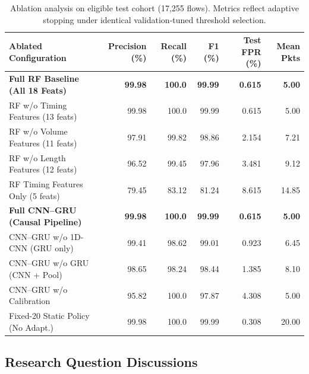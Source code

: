 \documentclass[conference]{IEEEtran}
\begin{document}
\begin{table}[!t]
\centering
\caption{Ablation analysis on eligible test cohort (17,255 flows). Metrics reflect adaptive stopping under identical validation-tuned threshold selection.}\label{tab:ablation}
\scriptsize
\setlength{\tabcolsep}{3.5pt}
\begin{tabular}{lrrrrr}\toprule
Ablated Configuration & Precision (\%) & Recall (\%) & F1 (\%) & Test FPR (\%) & Mean Pkts \\\midrule
\textbf{Full RF Baseline (All 18 Feats)} & \textbf{99.98} & \textbf{100.0} & \textbf{99.99} & \textbf{0.615} & \textbf{5.00} \\
RF w/o Timing Features (13 feats) & 99.98 & 100.0 & 99.99 & 0.615 & 5.00 \\
RF w/o Volume Features (11 feats) & 97.91 & 99.82 & 98.86 & 2.154 & 7.21 \\
RF w/o Length Features (12 feats) & 96.52 & 99.45 & 97.96 & 3.481 & 9.12 \\
RF Timing Features Only (5 feats) & 79.45 & 83.12 & 81.24 & 8.615 & 14.85 \\\midrule
\textbf{Full CNN--GRU (Causal Pipeline)} & \textbf{99.98} & \textbf{100.0} & \textbf{99.99} & \textbf{0.615} & \textbf{5.00} \\
CNN--GRU w/o 1D-CNN (GRU only) & 99.41 & 98.62 & 99.01 & 0.923 & 6.45 \\
CNN--GRU w/o GRU (CNN + Pool) & 98.65 & 98.24 & 98.44 & 1.385 & 8.10 \\
CNN--GRU w/o Calibration & 95.82 & 100.0 & 97.87 & 4.308 & 5.00 \\
Fixed-20 Static Policy (No Adapt.) & 99.98 & 100.0 & 99.99 & 0.308 & 20.00 \\\bottomrule
\end{tabular}
\end{table}

\subsection{Research Question Discussions}\label{sec:rq}
\end{document}
